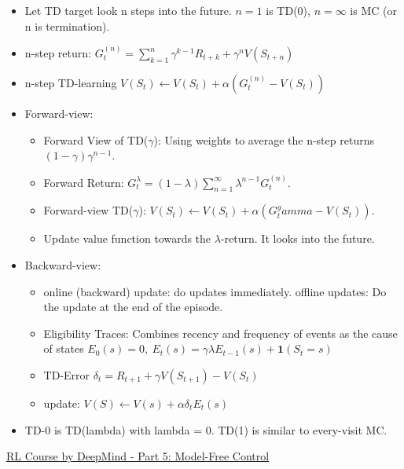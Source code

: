 \begin{itemize}
\begin{itemize}[noitemsep,nolistsep]
		\item Let TD target look n steps into the future. $n = 1$ is TD(0), $n = \infty$ is MC (or n is termination).
		\item n-step return: $G_t^{(n)} = \sum_{k = 1}^{n} \gamma^{k-1} R_{t+k} + \gamma^nV(S_{t+n})$
		\item n-step TD-learning $V(S_t) \leftarrow V(S_t) + \alpha(G_t^{(n)} - V(S_t))$
		\item Forward-view:
		\begin{itemize}[noitemsep,nolistsep]
			\item Forward View of TD($\gamma$): Using weights to average the n-step returns $(1-\gamma)\gamma^{n-1}$.
			\item Forward Return: $G_t^\lambda = (1-\lambda)\sum_{n=1}^\infty \lambda^{n-1}G_t^{(n)}$.
			\item Forward-view TD($\gamma$): $V(S_t) \leftarrow V(S_t) + \alpha (G_t^gamma - V(S_t))$.
			\item Update value function towards the $\lambda$-return. It looks into the future.
		\end{itemize}
		\item Backward-view:
		\begin{itemize}[noitemsep,nolistsep]
			\item online (backward) update: do updates immediately. offline updates: Do the update at the end of the episode.
			\item Eligibility Traces: Combines recency and frequency of events as the cause of states $E_0(s) = 0,\ E_t(s) = \gamma \lambda E_{t-1}(s) + \textbf{1}(S_t = s)$
			\item TD-Error $\delta_t = R_{t+1} + \gamma V(S_{t+1}) - V(S_t)$
			\item update: $V(S) \leftarrow V(s) + \alpha \delta_t E_t(s)$
		\end{itemize}
		\item TD-0 is TD(lambda) with lambda = 0. TD(1) is similar to every-visit MC.
	\end{itemize}
\end{itemize}
\href{https://www.youtube.com/watch?v=0g4j2k_Ggc4}{RL Course by DeepMind - Part 5: Model-Free Control}
